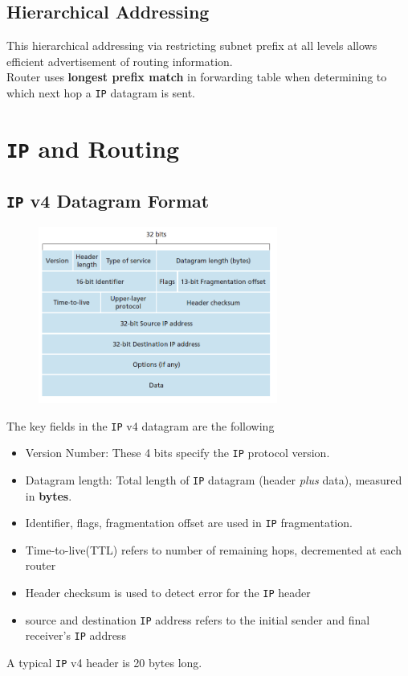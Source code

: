 \documentclass[12pt]{article}
\newcommand\IP{\texttt{IP} }
\theoremstyle{definition}
\begin{document}
\subsection{Hierarchical Addressing}
This hierarchical addressing via restricting subnet prefix at all levels allows efficient advertisement of routing information. \\Router uses \textbf{longest prefix match} in forwarding table when determining to which next hop a \IP datagram is sent.
\clearpage
\section{\IP{ and Routing}}
\subsection{\IP{v4} Datagram Format}
\begin{figure}[h]
\centering
\includegraphics[width = 0.7\textwidth]{6_1_1.png}
\end{figure}
The key fields in the \IP{v4} datagram are the following
\begin{itemize}
  \item Version Number: These 4 bits specify the \IP protocol version.
  \item Datagram length: Total length of \IP datagram (header \textit{plus} data), measured in \textbf{bytes}.
  \item Identifier, flags, fragmentation offset are used in \IP fragmentation.
  \item Time-to-live(TTL) refers to number of remaining hops, decremented at each router
  \item Header checksum is used to detect error for the \IP header
  \item source and destination \IP address refers to the initial sender and final receiver's \IP address
\end{itemize}
A typical \IP{v4} header is 20 bytes long.
\end{document}
